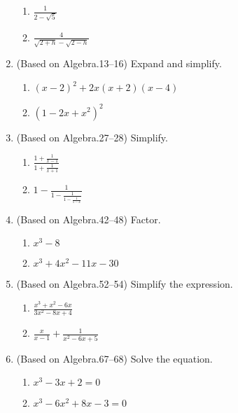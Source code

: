 \documentclass[11pt]{article}
\newcommand{\ds}{\displaystyle}
\begin{document}
\begin{enumerate}
\begin{multicols}{2}
  \begin{enumerate}
  \item $\ds \frac{1}{2-\sqrt{5}}$
  \item $\ds \frac{4}{\sqrt{2+h}-\sqrt{2-h}}$
  \end{enumerate}
  \end{multicols}
\item (Based on Algebra.13--16) Expand and simplify. %
  \begin{multicols}{2}
  \begin{enumerate}
  \item $\ds (x-2)^2 +2x(x+2)(x-4)$
  \item $\ds (1-2x+x^2)^2$
  \end{enumerate}
  \end{multicols}
\item (Based on Algebra.27--28) Simplify. %
  \begin{multicols}{2}
  \begin{enumerate}
  \item $\ds \frac{1+\frac{1}{x-1}}{1+\frac{1}{x+1}}$
  \item $\ds 1-\frac{1}{1-\frac{1}{1-\frac{1}{1-x}}}$
  \end{enumerate}
  \end{multicols}
\item (Based on Algebra.42--48) Factor. %
  \begin{multicols}{2}
  \begin{enumerate}
  \item $\ds x^3-8$
  \item $\ds x^3 +4x^2-11x-30$
  \end{enumerate}
  \end{multicols}
\item (Based on Algebra.52--54) Simplify the expression. %
  \begin{multicols}{2}
  \begin{enumerate}
  \item $\ds\frac{x^3+x^2-6x}{3x^2-8x+4}$
  \item $\ds\frac{x}{x-1} + \frac{1}{x^2-6x+5}$
  \end{enumerate}
  \end{multicols}
\item (Based on Algebra.67--68) Solve the equation. %
  \begin{multicols}{2}
  \begin{enumerate}
  \item $\ds x^3-3x+2=0$
  \item $\ds x^3-6x^2+8x-3=0$

\end{enumerate}
\end{multicols}
\end{enumerate}
\end{document}
